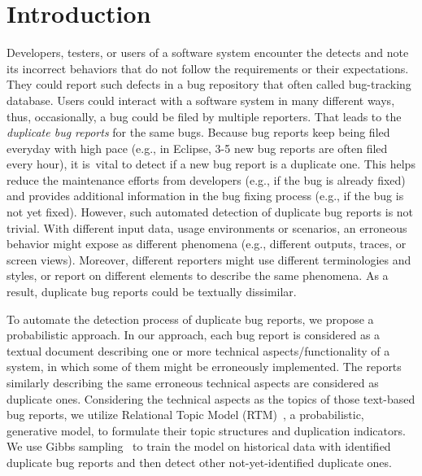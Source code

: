 \section{Introduction}
\label{intro}


Developers, testers, or users of a software system encounter the
detects and note its incorrect behaviors that do not follow the
requirements or their expectations. They could report such defects in
a bug repository that often called bug-tracking database.
%
%
Users could interact with a software system in many different ways,
thus, occasionally, a bug could be filed by multiple reporters. That
leads to the {\em duplicate bug reports} for the same bugs. Because
bug reports keep being filed everyday with high pace (e.g., in
Eclipse, 3-5 new bug reports are often filed every hour), it is~vital
to detect if a new bug report is a duplicate one. This
helps reduce the maintenance efforts from developers (e.g., if the bug
is already fixed) and provides additional information in the bug
fixing process (e.g., if the bug is not yet fixed).
%
However, such automated detection of duplicate bug reports is not
trivial. With different input data, usage environments or scenarios,
an erroneous behavior might expose as different phenomena (e.g.,
different outputs, traces, or screen views). Moreover, different
reporters might use different terminologies and styles, or report on
different elements to describe the same phenomena. As a result,
duplicate bug reports could be textually dissimilar.


To automate the detection process of duplicate bug reports, we propose
a probabilistic approach. In our approach, each bug report is
considered as a textual document describing one or more technical
aspects/functionality of a system, in which some of them might be
erroneously implemented. The reports similarly describing the same
erroneous technical aspects are considered as duplicate
ones. Considering the technical aspects as the topics of those
text-based bug reports, we utilize Relational Topic Model
(RTM)~\cite{RTM}, a probabilistic, generative model, to formulate
their topic structures and duplication indicators. We use Gibbs
sampling~\cite{gibb} to train the model on historical data with
identified duplicate bug reports and then detect other
not-yet-identified duplicate ones.


